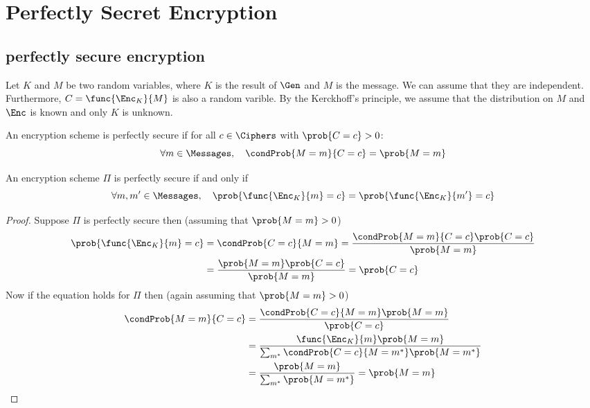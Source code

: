 \chapter{Perfectly Secret Encryption}
\section{perfectly secure encryption}
Let \(K\) and \(M\) be two random variables, where \(K\) is the result of \(\Gen\) and \(M\) is the message. We can assume that they are independent. Furthermore, \( C = \func{\Enc_K}{M}\) is also a random varible. By the Kerckhoff's principle, we assume that the distribution on \(M\) and \(\Enc\) is known and only \(K\) is unknown. 

\begin{definition}
    An encryption scheme is perfectly secure if for all \(c \in \Ciphers\) with \(\prob{C = c} > 0\):
    \begin{equation}
        \forall m \in \Messages, \quad \condProb{M = m}{C = c} = \prob{M = m}
    \end{equation}
 \end{definition} 

 \begin{proposition}
     An encryption scheme \(\Pi\) is perfectly secure if and only if 
     \begin{equation}
         \forall m,m' \in \Messages, \quad \prob{\func{\Enc_K}{m} = c} = \prob{\func{\Enc_K}{m'} = c}
     \end{equation}
 \end{proposition}

 \begin{proof}
     Suppose \(\Pi\) is perfectly secure then (assuming that \(\prob{M = m} > 0\))
     \begin{align*}
         \prob{\func{\Enc_K}{m} = c} &=  \condProb{C = c}{M = m} = \dfrac{\condProb{M = m}{C = c} \prob{C = c}}{\prob{M = m}}\\
         &= \dfrac{\prob{M = m} \prob{C= c}}{\prob{M= m}} = \prob{C = c}
     \end{align*}
     Now if the equation holds for \(\Pi\) then (again assuming that \(\prob{M = m} > 0 \))
     \begin{align*}
        \condProb{M = m}{C = c} &= \dfrac{\condProb{C = c}{M = m} \prob{M = m}}{\prob{C = c}}\\
        &= \dfrac{\func{\Enc_K}{m} \prob{M = m}}{\sum_{m^{\ast}} \condProb{C = c}{M = m^{\ast}} \prob{M = m^{\ast}}}\\
        &= \dfrac{\prob{M = m}}{\sum_{m^{\ast}} \prob{M = m^{\ast}}} = \prob{M = m}
     \end{align*}
 \end{proof}

